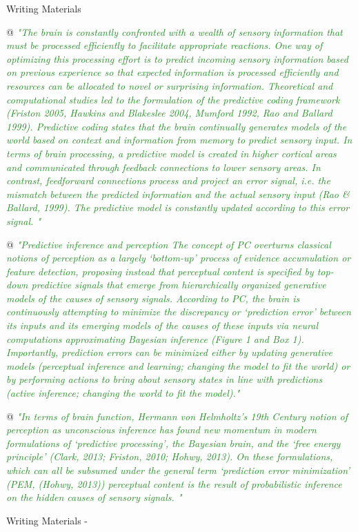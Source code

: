 \documentclass[utf8]{article}
\newenvironment{WritingMaterials} %
    	{
            \begin{tcolorbox}[enhanced,
                title=-,
                size=small,
                colbacktitle=Aquamarine,
                drop fuzzy shadow,
                fontupper=\small,
                boxrule=0.4pt,
                colback=Aquamarine!10!white,
                sharp corners]
                Writing Materials
            \end{tcolorbox}
            \begin{easylist}[itemize]
    	}
    	{
            \end{easylist}  
            \begin{tcolorbox}[enhanced,
                halign=flush right,
                halign title=right,
                size=small,
                colbacktitle=Aquamarine,
                drop fuzzy shadow,
                fontupper=\small,
                boxrule=0.4pt,
                colback=Aquamarine,
                colupper=White,
                sharp corners]
                Writing Materials -
            \end{tcolorbox}        
    	}
\newcommand{\rewrite}[1]{\textcolor{ForestGreen}{\textit{"#1"}}\newline}
\begin{document}
\begin{WritingMaterials}
				@ \rewrite{The brain is constantly confronted with a wealth of sensory information that must be processed efficiently to facilitate appropriate reactions. One way of optimizing this processing effort is to predict incoming sensory information based on previous experience so that expected information is processed efficiently and resources can be allocated to novel or surprising information. Theoretical and computational studies led to the formulation of the predictive coding framework (Friston 2005, Hawkins and Blakeslee 2004, Mumford 1992, Rao and Ballard 1999). Predictive coding states that the brain continually generates models of the world based on context and information from memory to predict sensory input. In terms of brain processing, a predictive model is created in higher cortical areas and communicated through feedback connections to lower sensory areas. In contrast, feedforward connections process and project an error signal, i.e. the mismatch between the predicted information and the actual sensory input (Rao \& Ballard, 1999). The predictive model is constantly updated according to this error signal. }




				@ \rewrite{Predictive inference and perception The concept of PC overturns classical notions of perception as a largely ‘bottom-up’ process of evidence accumulation or feature detection, proposing instead that perceptual content is speciﬁed by top-down predictive signals that emerge from hierarchically organized generative models of the causes of sensory signals. According to PC, the brain is continuously attempting to minimize the discrepancy or ‘prediction error’ between its inputs and its emerging models of the causes of these inputs via neural computations approximating Bayesian inference (Figure 1 and Box 1). Importantly, prediction errors can be minimized either by updating generative models (perceptual inference and learning; changing the model to ﬁt the world) or by performing actions to bring about sensory states in line with predictions (active inference; changing the world to ﬁt the model).}

				@ \rewrite{In terms of brain function, Hermann von Helmholtz’s 19th Century notion of perception as unconscious inference has found new momentum in modern formulations of ‘predictive processing’, the Bayesian brain, and the ‘free energy principle’ (Clark, 2013; Friston, 2010; Hohwy, 2013). On these formulations, which can all be subsumed under the general term ‘prediction error minimization’ (PEM, (Hohwy, 2013)) perceptual content is the result of probabilistic inference on the hidden causes of sensory signals. }


\end{WritingMaterials}
\end{document}
